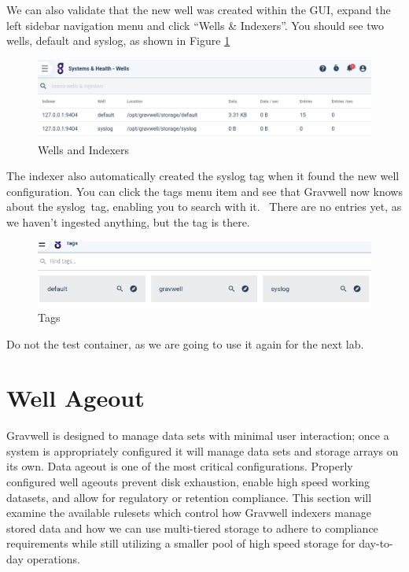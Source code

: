 {{We can also validate that the new well was created within the GUI,
expand the left sidebar navigation menu and click ``Wells \& Indexers''.
You should see two wells, default and syslog, as shown in Figure \ref{fig:wells}

\begin{figure}
	\includegraphics{images/wells.png}
	\caption{Wells and Indexers}
	\label{fig:wells}
\end{figure}

{The indexer also automatically created the syslog tag when it found the
new well configuration. You can click the tags menu item and see that
Gravwell now knows about the }{syslog}{~tag, enabling you to search with
it. ~There are no entries yet, as we haven't ingested anything, but the
tag is there.}

\begin{figure}
	\includegraphics{images/tags.png}
	\caption{Tags}
\end{figure}

Do not  the test container, as we are
going to use it again for the next lab.

\section{Well Ageout}
Gravwell is designed to manage data sets with minimal user interaction;
once a system is appropriately configured it will manage data sets and
storage arrays on its own. Data ageout is one of the most critical
configurations. Properly configured well ageouts prevent disk
exhaustion, enable high speed working datasets, and allow for regulatory
or retention compliance. This section will examine the available
rulesets which control how Gravwell indexers manage stored data and how
we can use multi-tiered storage to adhere to compliance requirements
while still utilizing a smaller pool of high speed storage for
day-to-day operations.

}}
